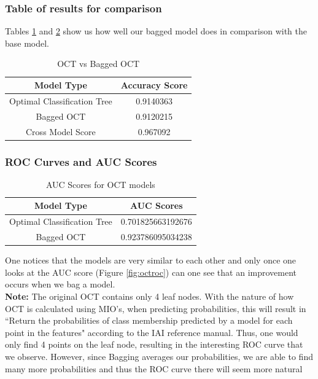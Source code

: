 \documentclass[11pt,a4paper]{report}
\begin{document}
\subsubsection{Table of results for comparison}
Tables \ref{tab:octbag} and \ref{tab:octauc} show us how well our bagged model does in comparison with the base model.
\begin{table}
    \centering
    \begin{tabular}{|c|c|}
        \hline
        \textbf{Model Type} & \textbf{Accuracy Score} \\
        \hline
        Optimal Classification Tree & 0.9140363\\
        \hline
        Bagged OCT & 0.9120215\\
        \hline
        Cross Model Score & 0.967092\\
        \hline
    \end{tabular}
    \caption{OCT vs Bagged OCT}
    \label{tab:octbag}
\end{table}

\subsubsection{ROC Curves and AUC Scores}
\begin{table}
    \centering
    \begin{tabular}{|c|c|}
        \hline
        \textbf{Model Type} & \textbf{AUC Scores} \\
        \hline
        Optimal Classification Tree & 0.701825663192676 \\
        \hline
        Bagged OCT & 0.923786095034238 \\
        \hline
    \end{tabular}
    \caption{AUC Scores for OCT models}
    \label{tab:octauc}
\end{table}
One notices that the models are very similar to each other and only once one looks at the AUC score (Figure \ref{fig:octroc}) can one see that an improvement occurs when we bag a model.
\medskip\\
\textbf{Note:} The original OCT contains only 4 leaf nodes.
With the nature of how OCT is calculated using MIO's, when predicting probabilities, this will result in ``Return the probabilities of class membership predicted by a model for each point in the features" according to the IAI reference manual. 
Thus, one would only find 4 points on the leaf node, resulting in the interesting ROC curve that we observe.
However, since Bagging averages our probabilities, we are able to find many more probabilities and thus the ROC curve there will seem more natural
\end{document}
